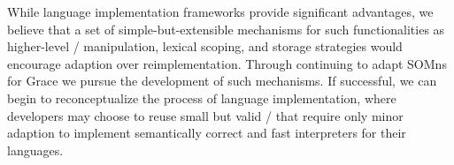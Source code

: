 While language implementation frameworks provide significant advantages, we believe that a set of simple-but-extensible mechanisms for such functionalities as higher-level \AST/ manipulation, lexical scoping, and storage strategies would encourage adaption over reimplementation. Through continuing to adapt SOMns for Grace we pursue the development of such mechanisms. If successful, we can begin to reconceptualize the process of language implementation, where developers may choose to reuse small but valid \vms/ that require only minor adaption to implement semantically correct and fast interpreters for their languages.

%

